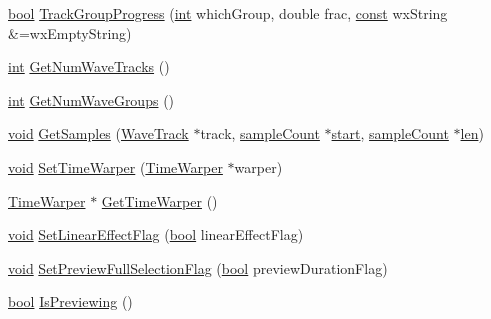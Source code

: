 \begin{DoxyCompactItemize}
\item 
\hyperlink{mac_2config_2i386_2lib-src_2libsoxr_2soxr-config_8h_abb452686968e48b67397da5f97445f5b}{bool} \hyperlink{class_effect_a4a99d55b8807097159a3ca4cd65b1ab2}{Track\+Group\+Progress} (\hyperlink{xmltok_8h_a5a0d4a5641ce434f1d23533f2b2e6653}{int} which\+Group, double frac, \hyperlink{getopt1_8c_a2c212835823e3c54a8ab6d95c652660e}{const} wx\+String \&=wx\+Empty\+String)
\item 
\hyperlink{xmltok_8h_a5a0d4a5641ce434f1d23533f2b2e6653}{int} \hyperlink{class_effect_a8f7eda5a9bc77d963ba4144bcea8fb81}{Get\+Num\+Wave\+Tracks} ()
\item 
\hyperlink{xmltok_8h_a5a0d4a5641ce434f1d23533f2b2e6653}{int} \hyperlink{class_effect_a421354dc5a46085ff1778a025e964716}{Get\+Num\+Wave\+Groups} ()
\item 
\hyperlink{sound_8c_ae35f5844602719cf66324f4de2a658b3}{void} \hyperlink{class_effect_ad00c1bc10d5d221f259befc97b8d643e}{Get\+Samples} (\hyperlink{class_wave_track}{Wave\+Track} $\ast$track, \hyperlink{include_2audacity_2_types_8h_afa427e1f521ea5ec12d054e8bd4d0f71}{sample\+Count} $\ast$\hyperlink{seqread_8c_ac503262ae470564980711da4f78b1181}{start}, \hyperlink{include_2audacity_2_types_8h_afa427e1f521ea5ec12d054e8bd4d0f71}{sample\+Count} $\ast$\hyperlink{lib_2expat_8h_af86d325fecfc8f47b61fbf5a5146f582}{len})
\item 
\hyperlink{sound_8c_ae35f5844602719cf66324f4de2a658b3}{void} \hyperlink{class_effect_a7907ede35a30fe5fbe96f36bed62126e}{Set\+Time\+Warper} (\hyperlink{class_time_warper}{Time\+Warper} $\ast$warper)
\item 
\hyperlink{class_time_warper}{Time\+Warper} $\ast$ \hyperlink{class_effect_a9de59351f18e576c28e32e1ac413ec98}{Get\+Time\+Warper} ()
\item 
\hyperlink{sound_8c_ae35f5844602719cf66324f4de2a658b3}{void} \hyperlink{class_effect_ab0794184a9633e4a4dd691cd1be36770}{Set\+Linear\+Effect\+Flag} (\hyperlink{mac_2config_2i386_2lib-src_2libsoxr_2soxr-config_8h_abb452686968e48b67397da5f97445f5b}{bool} linear\+Effect\+Flag)
\item 
\hyperlink{sound_8c_ae35f5844602719cf66324f4de2a658b3}{void} \hyperlink{class_effect_a6414ff51face3941c10b8e42443cd2ca}{Set\+Preview\+Full\+Selection\+Flag} (\hyperlink{mac_2config_2i386_2lib-src_2libsoxr_2soxr-config_8h_abb452686968e48b67397da5f97445f5b}{bool} preview\+Duration\+Flag)
\item 
\hyperlink{mac_2config_2i386_2lib-src_2libsoxr_2soxr-config_8h_abb452686968e48b67397da5f97445f5b}{bool} \hyperlink{class_effect_a4b1b213bebdb22a9f602f745cd978860}{Is\+Previewing} ()

\end{DoxyCompactItemize}
